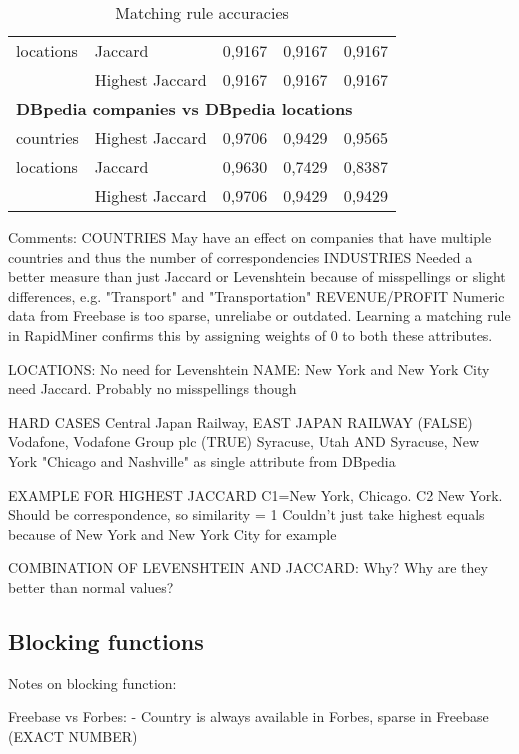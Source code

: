 \begin{table}[]
\begin{tabular}{lllll}
locations & Jaccard & 0,9167 & 0,9167 & 0,9167 \\
 & Highest Jaccard & 0,9167 & 0,9167 & 0,9167 \\
\multicolumn{5}{l}{\textbf{DBpedia companies vs DBpedia locations}} \\
countries & Highest Jaccard & 0,9706 & 0,9429 & 0,9565 \\
locations & Jaccard & 0,9630 & 0,7429 & 0,8387 \\
 & Highest Jaccard & 0,9706 & 0,9429 & 0,9429
\end{tabular}
\caption{Matching rule accuracies}
\label{my-label}
\end{table}


Comments:
COUNTRIES
May have an effect on companies that have multiple countries and thus the number of correspondencies
INDUSTRIES
Needed a better measure than just Jaccard or Levenshtein because of misspellings or slight differences, e.g. "Transport" and "Transportation"
REVENUE/PROFIT
Numeric data from Freebase is too sparse, unreliabe or outdated. Learning a matching rule in RapidMiner confirms this by assigning weights of 0 to both these attributes.


LOCATIONS: No need for Levenshtein
	NAME: New York and New York City need Jaccard. Probably no misspellings though



HARD CASES
Central Japan Railway, EAST JAPAN RAILWAY (FALSE)
Vodafone, Vodafone Group plc (TRUE)
Syracuse, Utah AND Syracuse, New York
"Chicago and Nashville" as single attribute from DBpedia

EXAMPLE FOR HIGHEST JACCARD 
	C1=New York, Chicago. C2 New York. Should be correspondence, so similarity = 1
	Couldn't just take highest equals because of New York and New York City for example
	
COMBINATION OF LEVENSHTEIN AND JACCARD: Why? Why are they better than normal values?
\subsection{Blocking functions}

Notes on blocking function:

Freebase vs Forbes: 
- Country is always available in Forbes, sparse in Freebase (EXACT NUMBER)

